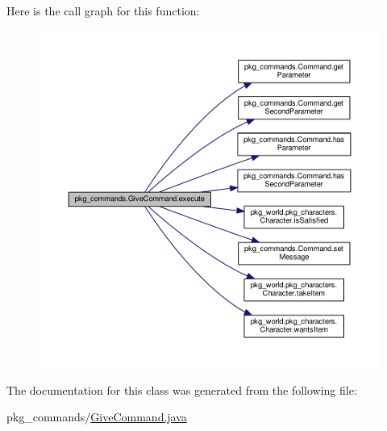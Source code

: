 Here is the call graph for this function\-:\nopagebreak
\begin{figure}[H]
\begin{center}
\leavevmode
\includegraphics[width=350pt]{classpkg__commands_1_1GiveCommand_a3a3cca7fae9b86d8ff85cc166564843d_cgraph}
\end{center}
\end{figure}




The documentation for this class was generated from the following file\-:\begin{DoxyCompactItemize}
\item 
pkg\-\_\-commands/\hyperlink{GiveCommand_8java}{Give\-Command.\-java}\end{DoxyCompactItemize}
